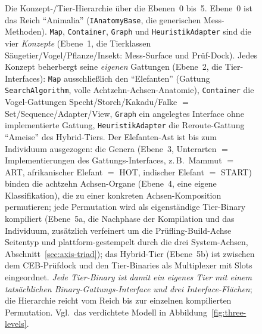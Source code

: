 \begin{nurkurz}
\begin{figure}[htbp]
\caption[Die vier Konzepte und die Tier-Hierarchie bis zum kompilierten Binary]{Die Konzept-/Tier-Hierarchie über die Ebenen~0 bis~5. Ebene~0 ist das Reich \enquote{Animalia} (\texttt{IAnatomyBase}, die generischen Mess-Methoden). \texttt{Map}, \texttt{Container}, \texttt{Graph} und \texttt{HeuristikAdapter} sind die vier \emph{Konzepte} (Ebene~1, die Tierklassen Säugetier/Vogel/Pflanze/Insekt: Mess-Surface und Prüf-Dock). Jedes Konzept beherbergt seine \emph{eigenen} Gattungen (Ebene~2, die Tier-Interfaces): \texttt{Map} ausschließlich den \enquote{Elefanten} (Gattung \texttt{SearchAlgorithm}, volle Achtzehn-Achsen-Anatomie), \texttt{Container} die Vogel-Gattungen Specht/Storch/Kakadu/Falke $=$ Set/Sequence/Adapter/View, \texttt{Graph} ein angelegtes Interface ohne implementierte Gattung, \texttt{HeuristikAdapter} die Reroute-Gattung \enquote{Ameise} des Hybrid-Tiers. Der Elefanten-Ast ist bis zum Individuum ausgezogen: die Genera (Ebene~3, Unterarten $=$ Implementierungen des Gattungs-Interfaces, z.\,B.\ Mammut $=$ ART, afrikanischer Elefant $=$ HOT, indischer Elefant $=$ START) binden die achtzehn Achsen-Organe (Ebene~4, eine eigene Klassifikation), die zu einer konkreten Achsen-Komposition permutieren; jede Permutation wird als eigenständige Tier-Binary kompiliert (Ebene~5a, die Nachphase der Kompilation und das Individuum, zusätzlich verfeinert um die Prüfling-Build-Achse Seitentyp und plattform-gestempelt durch die drei System-Achsen, Abschnitt~\ref{sec:axis-triad}); das Hybrid-Tier (Ebene~5b) ist zwischen dem CEB-Prüfdock und den Tier-Binaries als Multiplexer mit Slots eingeordnet\@. \emph{Jede Tier-Binary ist damit ein eigenes Tier mit einem tatsächlichen Binary-Gattungs-Interface und drei Interface-Flächen}; die Hierarchie reicht vom Reich bis zur einzelnen kompilierten Permutation. Vgl.\ das verdichtete Modell in Abbildung~\ref{fig:three-levels}.}\label{fig:genera}
\end{figure}
\end{nurkurz}

